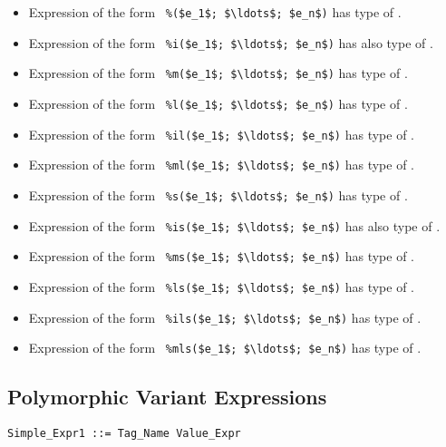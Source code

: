 \begin{itemize}
  \item Expression of the form ~\lstinline!%($e_1$; $\ldots$; $e_n$)!
    has type of . 
  \item Expression of the form ~\lstinline!%i($e_1$; $\ldots$; $e_n$)!
    has also type of . 
  \item Expression of the form ~\lstinline!%m($e_1$; $\ldots$; $e_n$)!
    has type of .
  \item Expression of the form ~\lstinline!%l($e_1$; $\ldots$; $e_n$)!
    has type of . 
  \item Expression of the form ~\lstinline!%il($e_1$; $\ldots$; $e_n$)!
    has type of . 
  \item Expression of the form ~\lstinline!%ml($e_1$; $\ldots$; $e_n$)!
    has type of .
  \item Expression of the form ~\lstinline!%s($e_1$; $\ldots$; $e_n$)!
    has type of . 
  \item Expression of the form ~\lstinline[deletekeywords={is}]!%is($e_1$; $\ldots$; $e_n$)!
    has also type of . 
  \item Expression of the form ~\lstinline!%ms($e_1$; $\ldots$; $e_n$)!
    has type of .
  \item Expression of the form ~\lstinline!%ls($e_1$; $\ldots$; $e_n$)!
    has type of . 
  \item Expression of the form ~\lstinline!%ils($e_1$; $\ldots$; $e_n$)!
    has type of . 
  \item Expression of the form ~\lstinline!%mls($e_1$; $\ldots$; $e_n$)!
    has type of .
\end{itemize}





\subsection{Polymorphic Variant Expressions}
\label{sec:polymorphic-variant-expressions}

\syntax\begin{lstlisting}
Simple_Expr1 ::= Tag_Name Value_Expr
\end{lstlisting}

